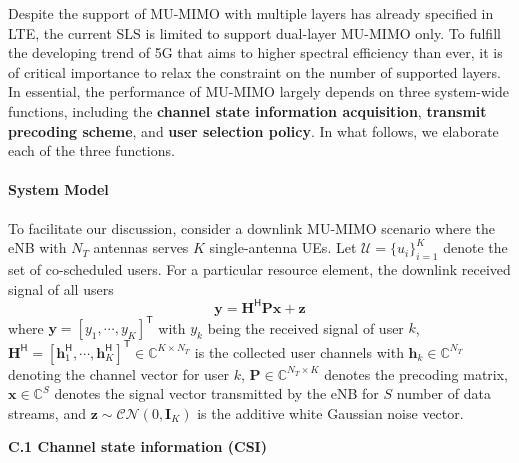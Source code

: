 \documentclass[a4paper,12pt]{article}%
\begin{document}
Despite the support of MU-MIMO with multiple layers has already specified in LTE, the current SLS is limited to support dual-layer MU-MIMO only. To fulfill the developing trend of 5G that aims to higher spectral efficiency than ever, it is of critical importance to relax the constraint on the number of supported layers. In essential, the performance of MU-MIMO largely depends on three system-wide functions, including the \textbf{channel state information acquisition}, \textbf{transmit precoding scheme}, and \textbf{user selection policy}. In what follows, we elaborate each of the three functions. %

\paragraph{System Model}

To facilitate our discussion, consider a downlink MU-MIMO scenario where the eNB with $N_T$ antennas serves $K$ single-antenna UEs. Let $\mathcal{U}=\{u_i\}_{i=1}^K$ denote the set of
co-scheduled users. For a particular resource element, the  downlink received signal of all users 
\begin{equation}\label{eq:rec-sig-mumimo}
\mathbf{y}=\mathbf{H}^\mathsf{H} \mathbf{P} \mathbf{x} + \mathbf{z}
\end{equation}
where $\mathbf{y}=[y_1,\cdots,y_K]^{\mathsf{T}}$ with $y_k$ being the received signal of user $k$, $\mathbf{H}^\mathsf{H}=[\mathbf{h}_1^\mathsf{H}, \cdots, \mathbf{h}_K^\mathsf{H}]^\mathsf{T} \in
\mathbb{C}^{K \times N_T}$ is the collected user channels with
$\mathbf{h}_k\in \mathbb{C}^{N_T}$ denoting the channel vector for user
$k$, $\mathbf{P} \in \mathbb{C}^{N_T \times K}$ denotes the precoding
matrix, $\mathbf{x} \in \mathbb{C}^{S}$ denotes the signal vector
transmitted by the eNB for $S$ number of data streams, and $\mathbf{z}\sim \mathcal{CN}(0,
\mathbf{I}_K)$ is the additive white Gaussian noise vector.



\noindent \textbf{C.1 Channel state information (CSI)}
\end{document}
